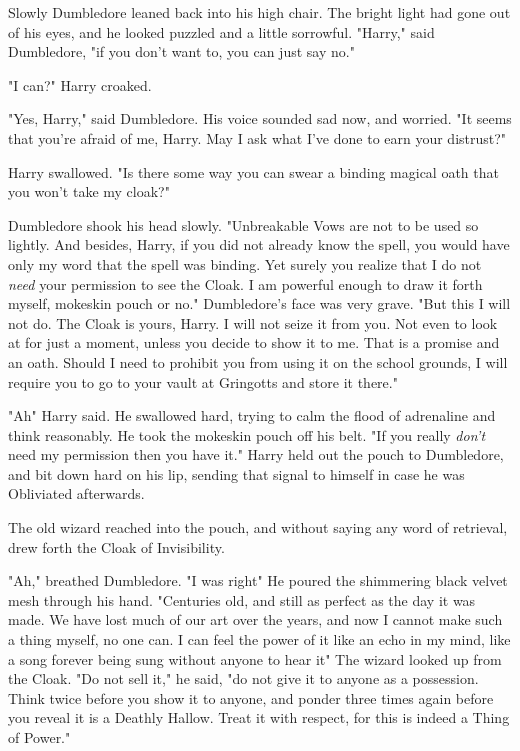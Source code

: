 Slowly Dumbledore leaned back into his high chair. The bright light had gone
out of his eyes, and he looked puzzled and a little sorrowful. "Harry," said
Dumbledore, "if you don't want to, you can just say no."

"I can?" Harry croaked.

"Yes, Harry," said Dumbledore. His voice sounded sad now, and worried. "It
seems that you're afraid of me, Harry. May I ask what I've done to earn your
distrust?"

Harry swallowed. "Is there some way you can swear a binding magical oath that
you won't take my cloak?"

Dumbledore shook his head slowly. "Unbreakable Vows are not to be used so
lightly. And besides, Harry, if you did not already know the spell, you would
have only my word that the spell was binding. Yet surely you realize that I do
not \emph{need} your permission to see the Cloak. I am powerful enough to draw
it forth myself, mokeskin pouch or no." Dumbledore's face was very grave. "But
this I will not do. The Cloak is yours, Harry. I will not seize it from you.
Not even to look at for just a moment, unless you decide to show it to me. That
is a promise and an oath. Should I need to prohibit you from using it on the
school grounds, I will require you to go to your vault at Gringotts and store
it there."

"Ah{\el}" Harry said. He swallowed hard, trying to calm the flood of
adrenaline and think reasonably. He took the mokeskin pouch off his belt. "If
you really \emph{don't} need my permission{\el} then you have it." Harry
held out the pouch to Dumbledore, and bit down hard on his lip, sending that
signal to himself in case he was Obliviated afterwards.

The old wizard reached into the pouch, and without saying any word of
retrieval, drew forth the Cloak of Invisibility.

"Ah," breathed Dumbledore. "I was right{\el}" He poured the shimmering black
velvet mesh through his hand. "Centuries old, and still as perfect as the day
it was made. We have lost much of our art over the years, and now I cannot make
such a thing myself, no one can. I can feel the power of it like an echo in my
mind, like a song forever being sung without anyone to hear it{\el}" The
wizard looked up from the Cloak. "Do not sell it," he said, "do not give it to
anyone as a possession. Think twice before you show it to anyone, and ponder
three times again before you reveal it is a Deathly Hallow. Treat it with
respect, for this is indeed a Thing of Power."

